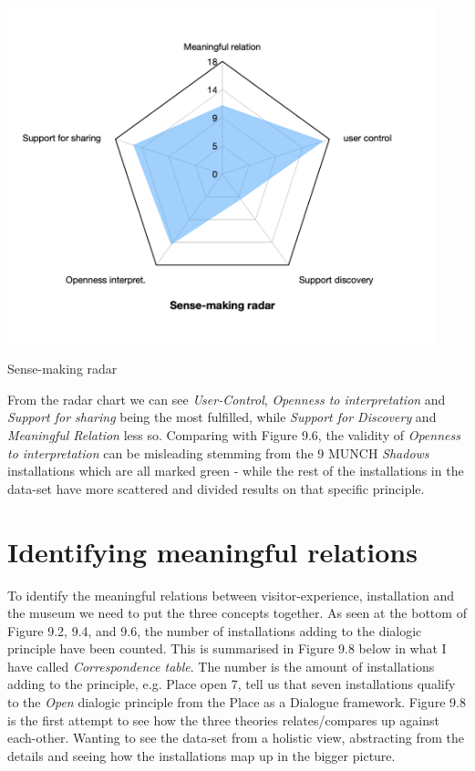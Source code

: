 \begin{table}[H]
    \includegraphics[width=12.5cm]{pictures/analysis/sense_radar.png}
    \caption{Sense-making radar}
    \centering 
\end{table}


From the radar chart we can see \textit{User-Control}, \textit{Openness to interpretation} and \textit{Support for sharing} being the most fulfilled, while \textit{Support for Discovery} and \textit{Meaningful Relation} less so. Comparing with Figure 9.6, the validity of \textit{Openness to interpretation} can be misleading stemming from the 9 MUNCH \textit{Shadows} installations which are all marked green - while the rest of the installations in the data-set have more scattered and divided results on that specific principle.


\par
\section{Identifying meaningful relations}
To identify the meaningful relations between visitor-experience, installation and the museum we need to put the three concepts together. As seen at the bottom of Figure 9.2, 9.4, and 9.6, the number of installations adding to the dialogic principle have been counted. This is summarised in Figure 9.8 below in what I have called \emph{Correspondence table}. The number is the amount of installations adding to the principle, e.g. Place open 7, tell us that seven installations qualify to the \emph{Open} dialogic principle from the Place as a Dialogue framework. Figure 9.8 is the first attempt to see how the three theories relates/compares up against each-other. Wanting to see the data-set from a holistic view, abstracting from the details and seeing how the installations map up in the bigger picture.


